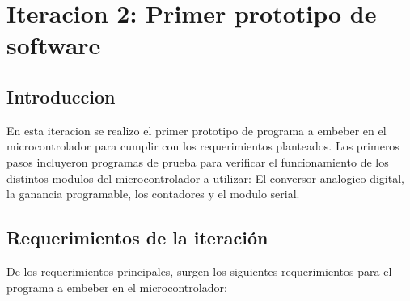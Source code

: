 \chapter{Iteracion 2: Primer prototipo de software} %
\label{cha:iteracion_2}

\section{Introduccion} %
\label{it2:sec:introduccion}


En esta iteracion se realizo el primer prototipo de programa a embeber en el microcontrolador para cumplir con los requerimientos planteados. Los primeros pasos incluyeron programas de prueba para verificar el funcionamiento de los distintos modulos del microcontrolador a utilizar: El conversor analogico-digital, la ganancia programable, los contadores y el modulo serial. 


\section{Requerimientos de la iteración} %
\label{it2:sec:requerimientos_de_la_iteracion}

De los requerimientos principales, surgen los siguientes requerimientos para el programa a embeber en el microcontrolador:

